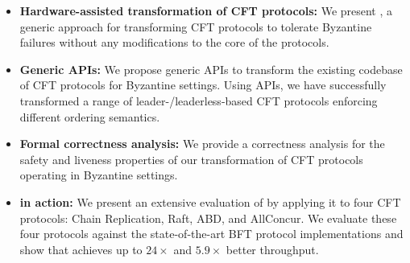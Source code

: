 \begin{itemize}[leftmargin=*]
    \item {\bf Hardware-assisted transformation of CFT protocols:} We present \projecttitle{}, a generic approach for transforming CFT protocols to tolerate Byzantine failures without any modifications to the core of the protocols.%

    \item {\bf Generic \projecttitle{} APIs:} We propose generic \projecttitle{} APIs to transform the existing codebase of CFT protocols for Byzantine settings. Using \projecttitle{} APIs, we have successfully
transformed a range of leader-/leaderless-based CFT protocols enforcing different ordering semantics. %

    
    \item {\bf Formal correctness analysis:}  We provide a correctness analysis for the safety and liveness properties of our
transformation of CFT protocols operating in Byzantine settings. %
    \item {\bf \projecttitle{} in action:} We present an extensive evaluation of \projecttitle{} by applying it to four CFT protocols: Chain Replication, Raft, ABD, and AllConcur. We evaluate these four protocols against the state-of-the-art BFT protocol implementations and show that \projecttitle{} achieves up to $24\times$ and $5.9\times$ better throughput.
    
\end{itemize}
\fi 

